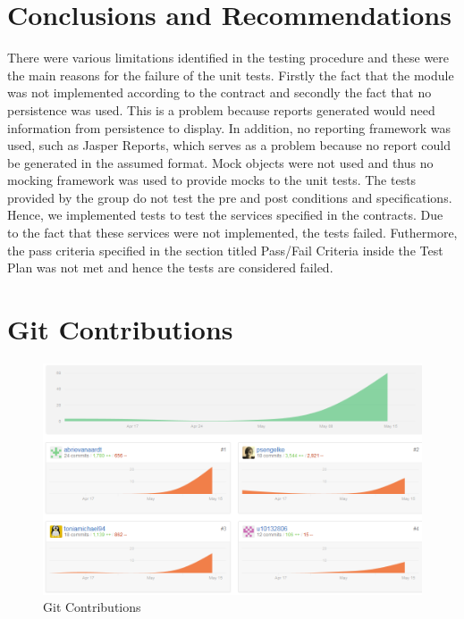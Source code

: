 \section{Conclusions and Recommendations}
\label{sec:conclusions}
There were various limitations identified in the testing procedure and these were the main reasons for the failure of the unit tests. Firstly the fact that the module was not implemented according to the contract and secondly the fact that no persistence was used. This is a problem because reports generated would need information from persistence to display. In addition, no reporting framework was used, such as Jasper Reports, which serves as a problem because no report could be generated in the assumed format. Mock objects were not used and thus no mocking framework was used to provide mocks to the unit tests. The tests provided by the group do not test the pre and post conditions and specifications. Hence, we implemented tests to test the services specified in the contracts. Due to the fact that these services were not implemented, the tests failed. Futhermore, the pass criteria specified in the section titled Pass/Fail Criteria inside the Test Plan was not met and hence the tests are considered failed. 

\newpage
\appendix
\section{Git Contributions}
\begin{figure}[h!]
	\includegraphics[scale=0.6]{./figures/gitGraph.PNG}
	\caption{Git Contributions}
\end{figure}

